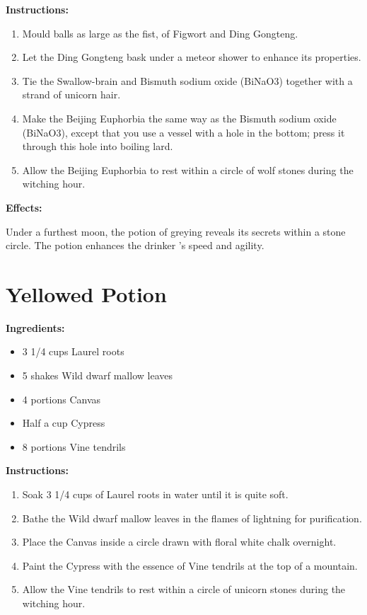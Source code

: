 \documentclass{article}
\begin{document}
\textbf{Instructions:}

\begin{enumerate}
  \item Mould balls as large as the fist, of Figwort and Ding Gongteng.
  \item Let the Ding Gongteng bask under a meteor shower to enhance its properties.
  \item Tie the Swallow-brain and Bismuth sodium oxide (BiNaO3) together with a strand of unicorn hair.
  \item Make the Beijing Euphorbia the same way as the Bismuth sodium oxide (BiNaO3), except that you use a vessel with a hole in the bottom; press it through this hole into boiling lard.
  \item Allow the Beijing Euphorbia to rest within a circle of wolf stones during the witching hour.
\end{enumerate}

\textbf{Effects:}

Under a furthest moon, the potion of greying reveals its secrets within a stone circle. The potion enhances the drinker 's speed and agility.

\newpage
\section*{Yellowed Potion}

\textbf{Ingredients:}

\begin{itemize}
  \item 3 1/4 cups Laurel roots
  \item 5 shakes Wild dwarf mallow leaves
  \item 4 portions Canvas
  \item Half a cup Cypress
  \item 8 portions Vine tendrils
\end{itemize}

\textbf{Instructions:}

\begin{enumerate}
  \item Soak 3 1/4 cups of Laurel roots in water until it is quite soft.
  \item Bathe the Wild dwarf mallow leaves in the flames of lightning for purification.
  \item Place the Canvas inside a circle drawn with floral white chalk overnight.
  \item Paint the Cypress with the essence of Vine tendrils at the top of a mountain.
  \item Allow the Vine tendrils to rest within a circle of unicorn stones during the witching hour.
\end{enumerate}
\end{document}
